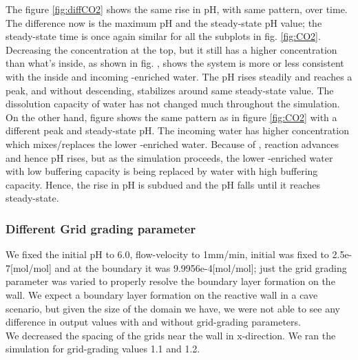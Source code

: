 The figure \ref{fig:diffCO2} shows the same rise in pH, with same pattern, over time. The difference now is the maximum pH and the steady-state pH value; the steady-state time is once again similar for all the subplots in fig. \ref{fig:CO2}. Decreasing the  concentration at the top, but it still has a higher  concentration than what's inside, as shown in fig. , shows the system is more or less consistent with the inside and incoming -enriched water. The pH rises steadily and reaches a peak, and without descending, stabilizes around same steady-state value. The dissolution capacity of water has not changed much throughout the simulation.\\
On the other hand, figure  shows the same pattern as in figure \ref{fig:CO2} with a different peak and steady-state pH. The incoming water has higher  concentration which mixes/replaces the lower -enriched water. Because of , reaction advances and hence pH rises, but as the simulation proceeds, the lower -enriched water with low buffering capacity is being replaced by water with high buffering capacity. Hence, the rise in pH is subdued and the pH falls until it reaches steady-state. 


\subsubsection*{Different Grid grading parameter} \label{ssec:diffGrid}
We fixed the initial pH to 6.0, flow-velocity to 1mm/min, initial  was fixed to 2.5e-7[mol/mol] and at the boundary it was 9.9956e-4[mol/mol]; just the grid grading parameter was varied to properly resolve the boundary layer formation on the wall. We expect a boundary layer formation on the reactive wall in a cave scenario, but given the size of the domain we have, we were not able to see any difference in output values with and without grid-grading parameters. \\
We decreased the spacing of the grids near the wall in x-direction. We ran the simulation for grid-grading values 1.1 and 1.2.

